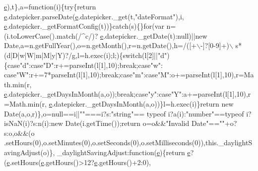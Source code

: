 \begin{DoxyCode}
      \hyperlink{jquery-ui_8min_8js_a2c038346d47955cbe2cb91e338edd7e1}{e}),t\},a=\textcolor{keyword}{function}(i)\{\textcolor{keywordflow}{try}\{\textcolor{keywordflow}{return} \hyperlink{jquery-ui_8min_8js_a2c038346d47955cbe2cb91e338edd7e1}{e}.datepicker.parseDate(\hyperlink{jquery-ui_8min_8js_a2c038346d47955cbe2cb91e338edd7e1}{e}.datepicker.\_get(t,\textcolor{stringliteral}{"dateFormat"}),i,
      \hyperlink{jquery-ui_8min_8js_a2c038346d47955cbe2cb91e338edd7e1}{e}.datepicker.\_getFormatConfig(t))\}\textcolor{keywordflow}{catch}(s)\{\}\textcolor{keywordflow}{for}(var n=(i.toLowerCase().match(/^c/)?
      \hyperlink{jquery-ui_8min_8js_a2c038346d47955cbe2cb91e338edd7e1}{e}.datepicker.\_getDate(t):null)||\textcolor{keyword}{new} Date,a=n.getFullYear(),o=n.getMonth(),r=n.getDate(),h=/([+\(\backslash\)-]?[0-9]+)\(\backslash\)
      s*(d|D|w|W|m|M|y|Y)?/g,l=h.exec(i);l;)\{\textcolor{keywordflow}{switch}(l[2]||\textcolor{stringliteral}{"d"})\{\textcolor{keywordflow}{case}\textcolor{stringliteral}{"d"}:\textcolor{keywordflow}{case}\textcolor{stringliteral}{"D"}:r+=parseInt(l[1],10);\textcolor{keywordflow}{break};\textcolor{keywordflow}{case}\textcolor{stringliteral}{"w"}:\textcolor{keywordflow}{
      case}\textcolor{stringliteral}{"W"}:r+=7*parseInt(l[1],10);\textcolor{keywordflow}{break};\textcolor{keywordflow}{case}\textcolor{stringliteral}{"m"}:\textcolor{keywordflow}{case}\textcolor{stringliteral}{"M"}:o+=parseInt(l[1],10),r=Math.min(r,
      \hyperlink{jquery-ui_8min_8js_a2c038346d47955cbe2cb91e338edd7e1}{e}.datepicker.\_getDaysInMonth(a,o));\textcolor{keywordflow}{break};\textcolor{keywordflow}{case}\textcolor{stringliteral}{"y"}:\textcolor{keywordflow}{case}\textcolor{stringliteral}{"Y"}:a+=parseInt(l[1],10),r=Math.min(r,
      \hyperlink{jquery-ui_8min_8js_a2c038346d47955cbe2cb91e338edd7e1}{e}.datepicker.\_getDaysInMonth(a,o))\}l=h.exec(i)\}\textcolor{keywordflow}{return} \textcolor{keyword}{new} Date(a,o,r)\},o=null==i||\textcolor{stringliteral}{""}===i?s:\textcolor{stringliteral}{"string"}==
      typeof i?a(i):\textcolor{stringliteral}{"number"}==typeof i?isNaN(i)?s:n(i):new Date(i.getTime());\textcolor{keywordflow}{return} o=o&&\textcolor{stringliteral}{"Invalid Date"}==\textcolor{stringliteral}{""}+o?s:o,o&&(o
      .setHours(0),o.setMinutes(0),o.setSeconds(0),o.setMilliseconds(0)),this.\_daylightSavingAdjust(o)\},
      \_daylightSavingAdjust:\textcolor{keyword}{function}(\hyperlink{jquery-ui_8min_8js_a2c038346d47955cbe2cb91e338edd7e1}{e})\{\textcolor{keywordflow}{return} \hyperlink{jquery-ui_8min_8js_a2c038346d47955cbe2cb91e338edd7e1}{e}?(\hyperlink{jquery-ui_8min_8js_a2c038346d47955cbe2cb91e338edd7e1}{e}.setHours(\hyperlink{jquery-ui_8min_8js_a2c038346d47955cbe2cb91e338edd7e1}{e}.getHours()>12?\hyperlink{jquery-ui_8min_8js_a2c038346d47955cbe2cb91e338edd7e1}{e}.getHours()+2:0),

\end{DoxyCode}
